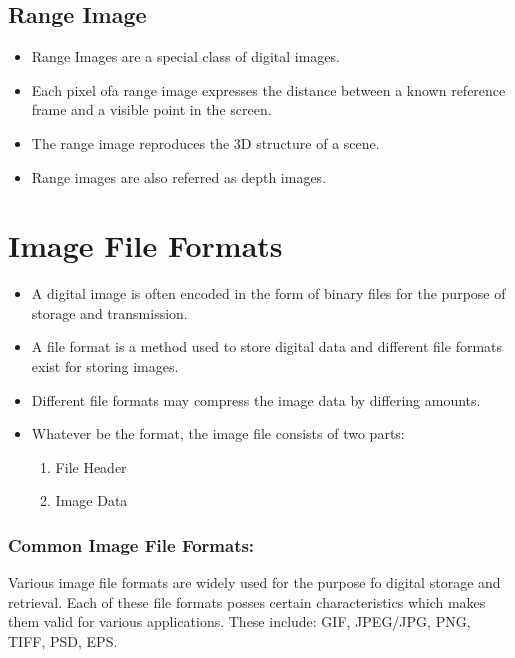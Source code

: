 \subsection{Range Image}

\begin{itemize}
    \item Range Images are a special class of digital images.
    \item Each pixel ofa range image expresses the distance between a known reference frame and a visible point in the screen.
    \item The range image reproduces the 3D structure of a scene.
    \item Range images are also referred as depth images.
\end{itemize}

\section{Image File Formats}

\begin{itemize}

    \item A digital image is often encoded in the form of binary files for the purpose of storage and transmission.
    \item A file format is a method used to store digital data and different file formats exist for storing images.
    \item Different file formats may compress the image data by differing amounts.
    \item Whatever be the format, the image file consists of two parts:
    \begin{enumerate}
        \item File Header
        \item Image Data
    \end{enumerate}
\end{itemize}

\subsubsection{Common Image File Formats:}

Various image file formats are widely used for the purpose fo digital storage and retrieval. Each of these file formats posses certain characteristics which makes them valid for various applications.
These include: GIF, JPEG/JPG, PNG, TIFF, PSD, EPS.


